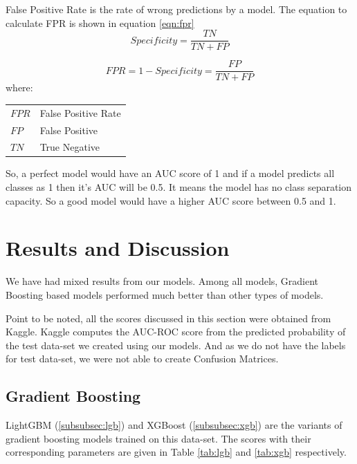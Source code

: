 \documentclass[sigconf, nonacm]{acmart}
\makeatletter
\newenvironment{conditions}
  {\par\vspace{\abovedisplayskip}\noindent\begin{tabular}{>{$}l<{$} @{${}={}$} l}}
  {\end{tabular}\par\vspace{\belowdisplayskip}}
\makeatother
\begin{document}
False Positive Rate is the rate of wrong predictions by a model. The equation to calculate FPR is shown in equation \ref{eqn:fpr}
\begin{equation}
	\label{eqn:spec}
	Specificity = \frac{TN}{TN + FP}
\end{equation}

\begin{equation}
	\label{eqn:fpr}
	FPR = 1 - Specificity
	= \frac{FP}{TN + FP}
\end{equation}
where:
\begin{conditions}
	FPR     &   False Positive Rate  \\
	FP      &   False Positive       \\
	TN      &   True Negative        \\
\end{conditions}

So, a perfect model would have an AUC score of 1 and if a model predicts all classes as 1 then it's AUC will be 0.5. It means the model has no class separation capacity. So a good model would have a higher AUC score between 0.5 and 1.

\section{Results and Discussion}

We have had mixed results from our models. Among all models, Gradient Boosting based models performed much better than other types of models.

Point to be noted, all the scores discussed in this section were obtained from Kaggle. Kaggle computes the AUC-ROC score from the predicted probability of the test data-set we created using our models. And as we do not have the labels for test data-set, we were not able to create Confusion Matrices.

\subsection{Gradient Boosting}

LightGBM (\ref{subsubsec:lgb}) and XGBoost (\ref{subsubsec:xgb}) are the variants of gradient boosting models trained on this data-set. The scores with their corresponding parameters are given in Table \ref{tab:lgb} and \ref{tab:xgb} respectively.
\end{document}
